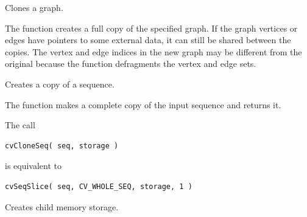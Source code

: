 Clones a graph.


\begin{description}
\end{description}


The function creates a full copy of the specified graph. If the
graph vertices or edges have pointers to some external data, it can still be
shared between the copies. The vertex and edge indices in the new graph
may be different from the original because the function defragments
the vertex and edge sets.

\fi

Creates a copy of a sequence.


\begin{description}
\end{description}

The function makes a complete copy of the input sequence and returns it.

\ifC
The call
\begin{lstlisting}
cvCloneSeq( seq, storage )
\end{lstlisting}

is equivalent to

\begin{lstlisting}
cvSeqSlice( seq, CV_WHOLE_SEQ, storage, 1 )
\end{lstlisting}

Creates child memory storage.


\begin{description}
\end{description}


